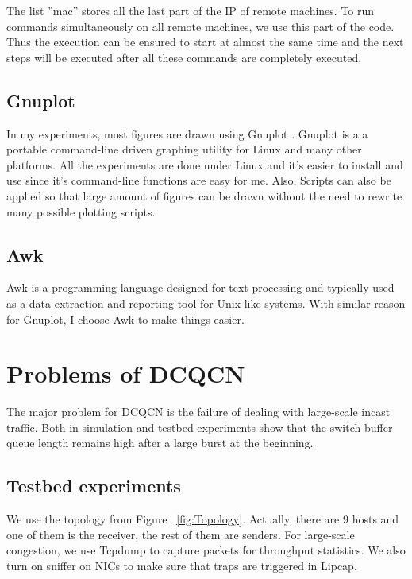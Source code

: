 \documentclass[12pt,a4paper]{article}
\begin{document}
The list ''mac'' stores all the last part of the IP of remote machines.
To run commands simultaneously on all remote machines, we use this part of the code.
Thus the execution can be ensured to start at almost the same time and the next steps 
will be executed after all these commands are completely executed.

\subsection{Gnuplot}

In my experiments, most figures are drawn using Gnuplot \cite{Gnuplot}.
Gnuplot is a a portable command-line driven graphing utility for Linux and many other platforms.
All the experiments are done under Linux and it's easier to install and use since it's command-line functions are easy for me.
Also, Scripts can also be applied so that large amount of figures can be drawn without the need
to rewrite many possible plotting scripts.

\subsection{Awk}

Awk \cite{Awk} is a programming language designed for text processing and typically used as a data extraction and reporting tool for Unix-like systems.
With similar reason for Gnuplot, I choose Awk to make things easier.

\newpage
\section{Problems of DCQCN}

The major problem for DCQCN is the failure of dealing with large-scale incast traffic.
Both in simulation \cite{NS3} and testbed experiments show that the switch buffer queue length remains high
after a large burst at the beginning.

\subsection{Testbed experiments}

We use the topology from Figure ~\ref{fig:Topology}.
Actually, there are 9 hosts and one of them is the receiver, the rest of them are senders.
For large-scale congestion, we use Tcpdump \cite{Tcpdump} to capture packets for throughput statistics.
We also turn on sniffer on NICs to make sure that traps are triggered in Lipcap.
\end{document}
